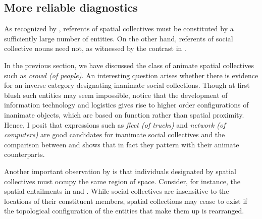 \documentclass[output=paper]{langscibook}
\begin{document}
\subsection{More reliable diagnostics}\label{wan:sec:more-reliable-diagnostics}

\noindent As recognized by \citet{henderson2017swarms}, referents of spatial collectives must be constituted by a sufficiently large number of entities. On the other hand, referents of social collective nouns need not, as witnessed by the contrast in .
	
	\ea\label{wan:ex:plurality} 
		\label{wan:ex:plurality-family} 
		\label{wan:ex:plurality-grove}
    \z	
    \z

\noindent In the previous section, we have discussed the class of animate spatial collectives such as \textit{crowd (of people)}. An interesting question arises whether there is evidence for an inverse category designating inanimate social collections. Though at first blush such entities may seem impossible, notice that the development of information technology and logistics gives rise to higher order configurations of inanimate objects, which are based on function rather than spatial proximity. Hence, I posit that expressions such as \textit{fleet (of trucks)} and \textit{network (of computers)} are good candidates for inanimate social collectives and the comparison between  and  shows that in fact they pattern with their animate counterparts.

	\label{wan:ex:plurality-fleet}
    \z

\noindent Another important observation by \citeauthor{henderson2017swarms} is that individuals designated by spatial collectives must occupy the same region of space. Consider, for instance, the spatial entailments in  and . While social collectives are insensitive to the locations of their constituent members, spatial collections may cease to exist if the topological configuration of the entities that make them up is rearranged.
	
	\ea\label{wan:ex:entailment-committee} 
		\label{wan:ex:entailment-committee1} 
		\label{wan:ex:entailment-committee2} 
	\z	
	\z
\end{document}
